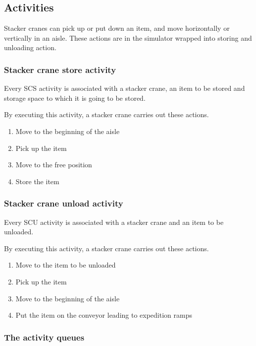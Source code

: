 \documentclass{ctuthesis}
\begin{document}
\subsection{Activities}

Stacker cranes can pick up or put down an item, and move horizontally or vertically in an aisle. These actions are in the simulator wrapped into storing and unloading action.

\subsubsection{Stacker crane store activity}

Every SCS activity is associated with a stacker crane, an item to be stored and storage space to which it is going to be stored.

By executing this activity, a stacker crane carries out these actions.

\begin{enumerate}
    \item Move to the beginning of the aisle
    \item Pick up the item
    \item Move to the free position
    \item Store the item
\end{enumerate}

\subsubsection{Stacker crane unload activity}

Every SCU activity is associated with a stacker crane and an item to be unloaded.

By executing this activity, a stacker crane carries out these actions.

\begin{enumerate}
    \item Move to the item to be unloaded
    \item Pick up the item
    \item Move to the beginning of the aisle
    \item Put the item on the conveyor leading to expedition ramps
\end{enumerate}

\subsubsection{The activity queues}
\label{subsec:activityqueue}
\end{document}
